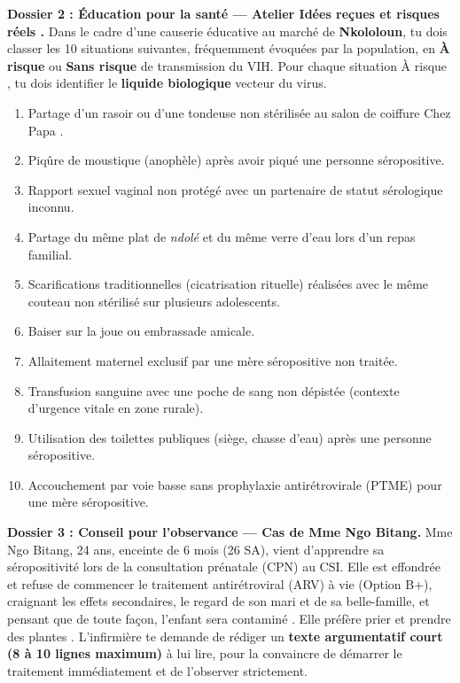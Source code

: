 \documentclass[11pt]{article}
\begin{document}
\textbf{Dossier 2 : Éducation pour la santé — Atelier \og Idées reçues et risques réels \fg.}
Dans le cadre d'une causerie éducative au marché de \textbf{Nkololoun}, tu dois classer les 10 situations suivantes, fréquemment évoquées par la population, en \textbf{À risque} ou \textbf{Sans risque} de transmission du VIH. Pour chaque situation \og À risque \fg, tu dois identifier le \textbf{liquide biologique} vecteur du virus.

\begin{enumerate}
    \item Partage d'un rasoir ou d'une tondeuse non stérilisée au salon de coiffure \og Chez Papa \fg.
    \item Piqûre de moustique (anophèle) après avoir piqué une personne séropositive.
    \item Rapport sexuel vaginal non protégé avec un partenaire de statut sérologique inconnu.
    \item Partage du même plat de \textit{ndolé} et du même verre d'eau lors d'un repas familial.
    \item Scarifications traditionnelles (cicatrisation rituelle) réalisées avec le même couteau non stérilisé sur plusieurs adolescents.
    \item Baiser sur la joue ou embrassade amicale.
    \item Allaitement maternel exclusif par une mère séropositive non traitée.
    \item Transfusion sanguine avec une poche de sang non dépistée (contexte d'urgence vitale en zone rurale).
    \item Utilisation des toilettes publiques (siège, chasse d'eau) après une personne séropositive.
    \item Accouchement par voie basse sans prophylaxie antirétrovirale (PTME) pour une mère séropositive.
\end{enumerate}

\textbf{Dossier 3 : Conseil pour l'observance — Cas de Mme Ngo Bitang.}
Mme Ngo Bitang, 24 ans, enceinte de 6 mois (26 SA), vient d'apprendre sa séropositivité lors de la consultation prénatale (CPN) au CSI. Elle est effondrée et refuse de commencer le traitement antirétroviral (ARV) à vie (Option B+), craignant les effets secondaires, le regard de son mari et de sa belle-famille, et pensant que \og de toute façon, l'enfant sera contaminé \fg. Elle préfère \og prier et prendre des plantes \fg. L'infirmière te demande de rédiger un \textbf{texte argumentatif court (8 à 10 lignes maximum)} à lui lire, pour la convaincre de démarrer le traitement immédiatement et de l'observer strictement.
\end{document}
